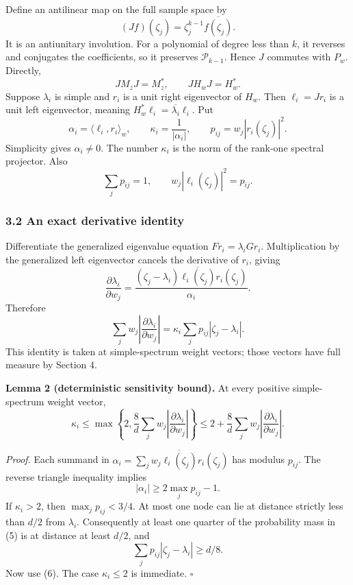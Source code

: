 \documentclass[
  11pt,
]{article}
\begin{document}
Define an antilinear map on the full sample space by \[
(Jf)(\zeta_j)=\zeta_j^{k-1}\overline{f(\zeta_j)}.
\] It is an antiunitary involution. For a polynomial of degree less than
\(k\), it reverses and conjugates the coefficients, so it preserves
\(\mathcal P_{k-1}\). Hence \(J\) commutes with \(P_w\). Directly, \[
JM_zJ=M_z^*,\qquad JH_wJ=H_w^*. \tag{4}
\] Suppose \(\lambda_i\) is simple and \(r_i\) is a unit right
eigenvector of \(H_w\). Then \(\ell_i=Jr_i\) is a unit left eigenvector,
meaning \(H_w^*\ell_i=\overline{\lambda_i}\ell_i\). Put \[
\alpha_i=\langle\ell_i,r_i\rangle_w,\qquad
\kappa_i=\frac{1}{|\alpha_i|},\qquad
p_{ij}=w_j|r_i(\zeta_j)|^2.
\] Simplicity gives \(\alpha_i\ne0\). The number \(\kappa_i\) is the
norm of the rank-one spectral projector. Also \[
\sum_jp_{ij}=1,\qquad
w_j|\ell_i(\zeta_j)|^2=p_{ij}. \tag{5}
\]

\subsubsection{3.2 An exact derivative
identity}\label{an-exact-derivative-identity}

Differentiate the generalized eigenvalue equation
\(Fr_i=\lambda_iGr_i\). Multiplication by the generalized left
eigenvector cancels the derivative of \(r_i\), giving \[
\frac{\partial\lambda_i}{\partial w_j}
=\frac{(\zeta_j-\lambda_i)\overline{\ell_i(\zeta_j)}r_i(\zeta_j)}{\alpha_i}.
\] Therefore \[
\sum_jw_j\left|\frac{\partial\lambda_i}{\partial w_j}\right|
=\kappa_i\sum_jp_{ij}|\zeta_j-\lambda_i|. \tag{6}
\] This identity is taken at simple-spectrum weight vectors; those
vectors have full measure by Section 4.

\textbf{Lemma 2 (deterministic sensitivity bound).} At every positive
simple-spectrum weight vector, \[
\kappa_i\leq
\max\left\{2,\frac8d\sum_jw_j\left|\frac{\partial\lambda_i}{\partial w_j}\right|\right\}
\leq2+\frac8d\sum_jw_j\left|\frac{\partial\lambda_i}{\partial w_j}\right|. \tag{7}
\]

\emph{Proof.} Each summand in
\(\alpha_i=\sum_jw_j\overline{\ell_i(\zeta_j)}r_i(\zeta_j)\) has modulus
\(p_{ij}\). The reverse triangle inequality implies \[
|\alpha_i|\geq2\max_jp_{ij}-1.
\] If \(\kappa_i>2\), then \(\max_jp_{ij}<3/4\). At most one node can
lie at distance strictly less than \(d/2\) from \(\lambda_i\).
Consequently at least one quarter of the probability mass in (5) is at
distance at least \(d/2\), and \[
\sum_jp_{ij}|\zeta_j-\lambda_i|\geq d/8.
\] Now use (6). The case \(\kappa_i\leq2\) is immediate. \(\square\)
\end{document}
